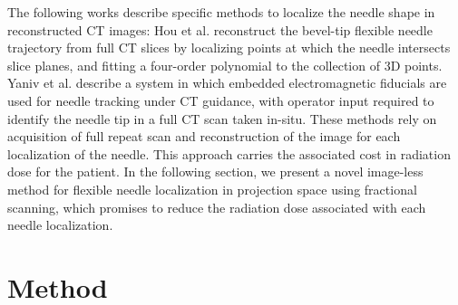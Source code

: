 The following works describe specific methods to localize the needle shape in reconstructed CT images:
Hou et al. \cite{huo2015shape} reconstruct the bevel-tip flexible needle trajectory from full CT slices by localizing points at which the needle intersects slice planes, and fitting a four-order polynomial to the collection of 3D points.
Yaniv et al. \cite{yaniv2010needle} describe a system in which embedded electromagnetic fiducials are used for needle tracking under CT guidance, with operator input required to identify the needle tip in a full CT scan taken in-situ. These methods rely on acquisition of full repeat scan and reconstruction of the image for each localization of the needle. This approach carries the associated cost in radiation dose for the patient. In the following section, we present a novel image-less method for flexible needle localization in projection space using fractional scanning, which promises to reduce the radiation dose associated with each needle localization.

\section{Method}

